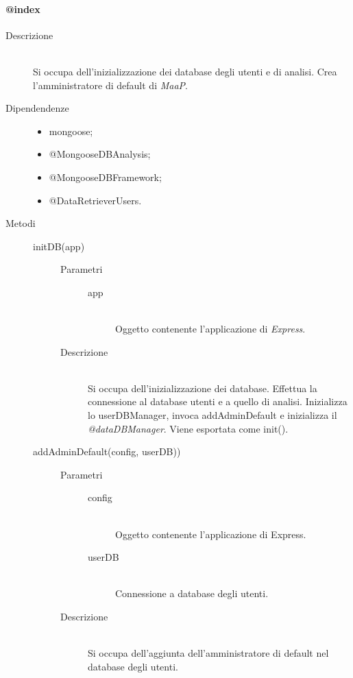\paragraph{@index}
\begin{description}
 \item[Descrizione] \hfill \\
 Si occupa dell'inizializzazione dei database degli utenti e di analisi. Crea l'amministratore di default di \textit{MaaP}.
 \item[Dipendendenze] \hfill
   \begin{itemize}
   \item mongoose;
   \item @MongooseDBAnalysis;
   \item @MongooseDBFramework;
   \item @DataRetrieverUsers.
   \end{itemize}
 \item[Metodi] \hfill
 \begin{description}
 \item[initDB(app)] \hfill 
 \begin{description}
    		\item[Parametri] \hfill
    			\begin{description}
    				\item[app] \hfill \\
    				Oggetto contenente l'applicazione di \textit{Express}.
    			\end{description}
    		\item[Descrizione] \hfill \\
    		Si occupa dell'inizializzazione dei database. Effettua la connessione al database utenti e a quello di analisi. Inizializza lo userDBManager, invoca addAdminDefault e inizializza il \textit{@dataDBManager}. Viene esportata come init().
    	\end{description}
  \item[addAdminDefault(config, userDB))] \hfill 
  \begin{description}
      		\item[Parametri] \hfill
      			\begin{description}
      				\item[config] \hfill \\
      				Oggetto contenente l'applicazione di Express.
      				\item[userDB] \hfill \\
      				Connessione a database degli utenti.
      			\end{description}
      		\item[Descrizione] \hfill \\
      		Si occupa dell'aggiunta dell'amministratore di default nel database degli utenti.
      	\end{description}
  
 \end{description}
\end{description}

